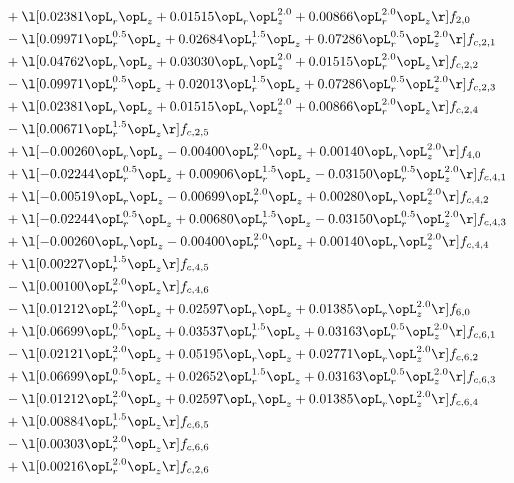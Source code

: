 \begin{alignat}{2}
& + \l[  0.02381 \opL_r \opL_z +  0.01515 \opL_r \opL_z^{2.0} +  0.00866 \opL_r^{2.0} \opL_z  \r] f_{2,0} \nonumber \\ 
& - \l[  0.09971 \opL_r^{0.5} \opL_z +  0.02684 \opL_r^{1.5} \opL_z +  0.07286 \opL_r^{0.5} \opL_z^{2.0}  \r] f_{c,2,1} \nonumber \\ 
& + \l[  0.04762 \opL_r \opL_z +  0.03030 \opL_r \opL_z^{2.0} +  0.01515 \opL_r^{2.0} \opL_z  \r] f_{c,2,2} \nonumber \\ 
& - \l[  0.09971 \opL_r^{0.5} \opL_z +  0.02013 \opL_r^{1.5} \opL_z +  0.07286 \opL_r^{0.5} \opL_z^{2.0}  \r] f_{c,2,3} \nonumber \\ 
& + \l[  0.02381 \opL_r \opL_z +  0.01515 \opL_r \opL_z^{2.0} +  0.00866 \opL_r^{2.0} \opL_z  \r] f_{c,2,4} \nonumber \\ 
& - \l[  0.00671 \opL_r^{1.5} \opL_z  \r] f_{c,2,5} \nonumber \\ 
& + \l[  -0.00260 \opL_r \opL_z   -0.00400 \opL_r^{2.0} \opL_z +  0.00140 \opL_r \opL_z^{2.0}  \r] f_{4,0} \nonumber \\ 
& + \l[  -0.02244 \opL_r^{0.5} \opL_z +  0.00906 \opL_r^{1.5} \opL_z   -0.03150 \opL_r^{0.5} \opL_z^{2.0}  \r] f_{c,4,1} \nonumber \\ 
& + \l[  -0.00519 \opL_r \opL_z   -0.00699 \opL_r^{2.0} \opL_z +  0.00280 \opL_r \opL_z^{2.0}  \r] f_{c,4,2} \nonumber \\ 
& + \l[  -0.02244 \opL_r^{0.5} \opL_z +  0.00680 \opL_r^{1.5} \opL_z   -0.03150 \opL_r^{0.5} \opL_z^{2.0}  \r] f_{c,4,3} \nonumber \\ 
& + \l[  -0.00260 \opL_r \opL_z   -0.00400 \opL_r^{2.0} \opL_z +  0.00140 \opL_r \opL_z^{2.0}  \r] f_{c,4,4} \nonumber \\ 
& + \l[  0.00227 \opL_r^{1.5} \opL_z  \r] f_{c,4,5} \nonumber \\ 
& - \l[  0.00100 \opL_r^{2.0} \opL_z  \r] f_{c,4,6} \nonumber \\ 
& - \l[  0.01212 \opL_r^{2.0} \opL_z +  0.02597 \opL_r \opL_z +  0.01385 \opL_r \opL_z^{2.0}  \r] f_{6,0} \nonumber \\ 
& + \l[  0.06699 \opL_r^{0.5} \opL_z +  0.03537 \opL_r^{1.5} \opL_z +  0.03163 \opL_r^{0.5} \opL_z^{2.0}  \r] f_{c,6,1} \nonumber \\ 
& - \l[  0.02121 \opL_r^{2.0} \opL_z +  0.05195 \opL_r \opL_z +  0.02771 \opL_r \opL_z^{2.0}  \r] f_{c,6,2} \nonumber \\ 
& + \l[  0.06699 \opL_r^{0.5} \opL_z +  0.02652 \opL_r^{1.5} \opL_z +  0.03163 \opL_r^{0.5} \opL_z^{2.0}  \r] f_{c,6,3} \nonumber \\ 
& - \l[  0.01212 \opL_r^{2.0} \opL_z +  0.02597 \opL_r \opL_z +  0.01385 \opL_r \opL_z^{2.0}  \r] f_{c,6,4} \nonumber \\ 
& + \l[  0.00884 \opL_r^{1.5} \opL_z  \r] f_{c,6,5} \nonumber \\ 
& - \l[  0.00303 \opL_r^{2.0} \opL_z  \r] f_{c,6,6} \nonumber \\ 
& + \l[  0.00216 \opL_r^{2.0} \opL_z  \r] f_{c,2,6} \nonumber \\ 
\end{alignat} 


